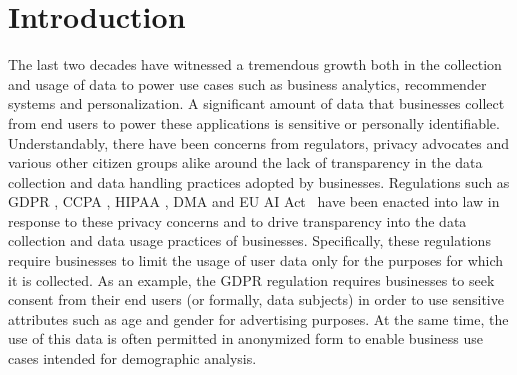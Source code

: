 \section{Introduction} \label{intro}
The last two decades have witnessed a tremendous growth both in the collection and usage of data to power use cases such as business analytics, recommender systems and personalization. A significant amount of data that businesses collect from end users to power these applications is sensitive or personally identifiable. Understandably, there have been concerns from regulators, privacy advocates and various other citizen groups alike around the lack of transparency in the data collection and data handling practices adopted by businesses. Regulations such as GDPR \cite{GDPR16}, CCPA \cite{CCPA18}, HIPAA \cite{HIPAA03}, DMA \cite{DMA24} and EU AI Act~\cite{AIAct24} have been enacted into law in response to these privacy concerns and to drive transparency into the data collection and data usage practices of businesses. Specifically, these regulations require businesses to limit the usage of user data only for the purposes for which it is collected. As an example, the GDPR regulation requires businesses to seek consent from their end users (or formally, data subjects) in order to use sensitive attributes such as age and gender for advertising purposes.  At the same time, the use of this data is often permitted in anonymized form to enable business use cases intended for demographic analysis. 

